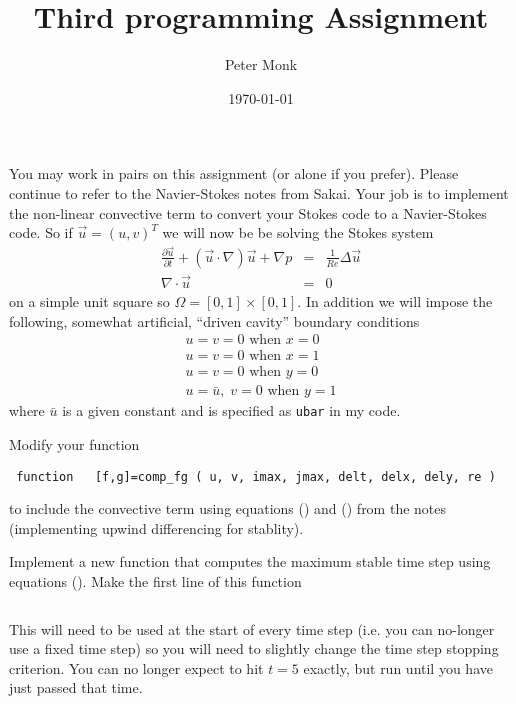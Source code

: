 \documentclass[11pt]{article}
\begin{document}
\title{Third programming Assignment}
\author{Peter Monk}
\date{\today}
\maketitle

You may work in pairs on this assignment (or alone if you prefer).  Please continue to refer to the Navier-Stokes notes from Sakai.  Your job is to implement the non-linear convective term to convert your Stokes code to a Navier-Stokes code.   So if $\vec{u}=(u,v)^T$ we will now be be solving the Stokes system 
\begin{eqnarray*}
\frac{\partial \vec{u}}{\partial t}+(\vec{u}\cdot\nabla)\vec{u}+\nabla p&=&\frac{1}{Re}\Delta\vec{u}\\
\nabla\cdot\vec{u}&=&0
\end{eqnarray*}
on a simple unit square so $\Omega=[0,1]\times [0,1]$.  In addition we will impose the following, somewhat artificial, ``driven cavity'' boundary conditions
\begin{eqnarray*}
u=v=0\mbox{ when }x=0\\
u=v=0\mbox{ when }x=1\\
u=v=0\mbox{ when }y=0\\
u=\bar{u},\;v=0\mbox{ when } y=1
\end{eqnarray*}
where $\bar{u}$ is a given constant and is specified as \verb+ubar+ in my code.

Modify your function
\begin{verbatim}
 function   [f,g]=comp_fg ( u, v, imax, jmax, delt, delx, dely, re )
    \end{verbatim}
    to include the convective term using equations () and () from the notes (implementing upwind differencing for stablity).

Implement a new function that computes the maximum stable time step using equations ().  Make the first line of this function
\begin{verbatim}

\end{verbatim}
This will need to be used at the start of every time step (i.e. you can no-longer use a fixed time step) so you will need to slightly change the time step stopping criterion.  You can no longer expect to hit $t=5$ exactly, but run until you have just passed that time.
\end{document}
